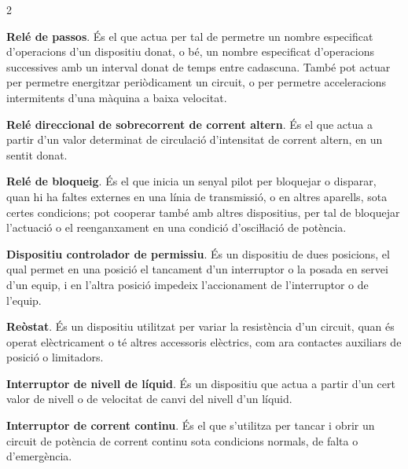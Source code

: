 \begin{multicols}{2}
\begin{list}{}
		\item[\textbf{66}]   
		\textbf{Relé de passos}. És el que actua per tal
		de permetre un nombre especificat d'operacions d'un dispositiu
		donat, o bé, un nombre especificat d'operacions successives amb un
		interval donat de temps entre cadascuna. També pot actuar per
		permetre energitzar periòdicament un circuit, o per permetre acceleracions intermitents d'una
		màquina a baixa velocitat.
		
		\item[\textbf{67}]  
		\textbf{Relé direccional de sobrecorrent de corrent altern}. És
		el que actua a partir d'un valor determinat de circulació
		d'intensitat de corrent altern, en un sentit donat.
		
		\item[\textbf{68}]   
		\textbf{Relé de bloqueig}. És el que inicia un senyal pilot per bloquejar o disparar, quan hi ha faltes externes en
		una línia de transmissió, o en altres aparells, sota certes
		condicions; pot cooperar també amb altres dispositius, per tal de
		bloquejar l'actuació o el reenganxament en una condició
		d'osciŀlació de potència.
		
		\item[\textbf{69}]   
		\textbf{Dispositiu controlador de permissiu}. És
		un dispositiu  de dues posicions, el qual permet en una posició el tancament d'un
		interruptor o la posada en servei d'un equip, i en l'altra posició
		impedeix l'accionament de l'interruptor o de l'equip.
		
		\item[\textbf{70}]   
		\textbf{Reòstat}. És un dispositiu utilitzat per
		variar la resistència d'un circuit, quan és operat elèctricament o té altres accessoris elèctrics, com ara contactes auxiliars de posició o limitadors.
		
		\item[\textbf{71}]   
		\textbf{Interruptor de nivell de líquid}. És un dispositiu que actua a partir d'un cert valor de nivell o de velocitat de canvi del nivell d'un líquid.
		
		\item[\textbf{72}]   
		\textbf{Interruptor de corrent continu}. És el que s'utilitza per tancar i obrir un circuit de potència de corrent continu
		sota condicions normals, de falta o d'emergència.
		

\end{list}
\end{multicols}
